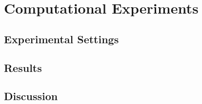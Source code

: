 \chapter{Computational Experiments}
\label{chap:experiments}

\section{Experimental Settings}
\label{sec:setup}

\section{Results}
\label{sec:results}

\section{Discussion}
\label{sec:discussion}
